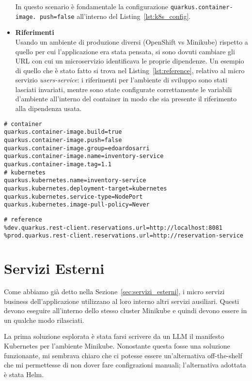 \begin{itemize}
        In questo scenario è fondamentale la configurazione \texttt{quarkus.container-image. \allowbreak push=false} all'interno del Listing~\ref{lst:k8s_config}.
    \item \textbf{Riferimenti} \\
        Usando un ambiente di produzione diversi (OpenShift vs Minikube) rispetto a quello per cui l'applicazione era stata pensata, si sono dovuti cambiare gli URL con cui un microservizio identificava le proprie dipendenze. Un esempio di quello che è stato fatto si trova nel Listing~\ref{lst:reference}, relativo al micro servizio \textit{users-service}: i riferimenti per l'ambiente di sviluppo sono stati lasciati invariati, mentre sono state configurate correttamente le variabili d'ambiente all'interno del container in modo che sia presente il riferimento alla dipendenza usata.
\end{itemize}

\begin{lstlisting}[caption=Kubernetes and Docker Configuration, label=lst:k8s_config]
# container
quarkus.container-image.build=true
quarkus.container-image.push=false
quarkus.container-image.group=edoardosarri
quarkus.container-image.name=inventory-service
quarkus.container-image.tag=1.1
# kubernetes
quarkus.kubernetes.name=inventory-service
quarkus.kubernetes.deployment-target=kubernetes
quarkus.kubernetes.service-type=NodePort
quarkus.kubernetes.image-pull-policy=Never
\end{lstlisting}

\begin{lstlisting}[caption=Reference in \textit{users-service}, label=lst:reference]
# reference
%dev.quarkus.rest-client.reservations.url=http://localhost:8081
%prod.quarkus.rest-client.reservations.url=http://reservation-service
\end{lstlisting}

\section{Servizi Esterni}
Come abbiamo già detto nella Sezione~\ref{sec:servizi_esterni}, i micro servizi business dell'applicazione utilizzano al loro interno altri servizi ausiliari. Questi devono eseguire all'interno dello stesso cluster Minikube e quindi devono essere in un qualche modo rilasciati.

La prima soluzione esplorata è stata farsi scrivere da un LLM il manifesto Kubernetes per l'ambiente Minikube. Nonostante questa fosse una soluzione funzionante, mi sembrava chiaro che ci potesse essere un'alternativa off-the-shelf che mi permettesse di non dover fare configrazioni manuali; l'alternativa adottata è stata Helm.

